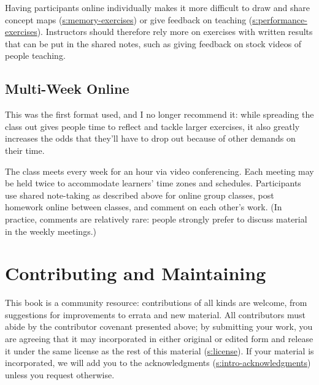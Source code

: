 Having participants online individually makes it more difficult to draw
and share concept maps (\protect\hyperlink{SECTION}{s:memory-exercises}) or give
feedback on teaching (\protect\hyperlink{SECTION}{s:performance-exercises}). Instructors
should therefore rely more on exercises with written results that can be
put in the shared notes, such as giving feedback on stock videos of
people teaching.

\subsection{Multi-Week Online}\label{multi-week-online}

This was the first format used, and I no longer recommend it: while
spreading the class out gives people time to reflect and tackle larger
exercises, it also greatly increases the odds that they'll have to drop
out because of other demands on their time.

The class meets every week for an hour via video conferencing. Each
meeting may be held twice to accommodate learners' time zones and
schedules. Participants use shared note-taking as described above for
online group classes, post homework online between classes, and comment
on each other's work. (In practice, comments are relatively rare: people
strongly prefer to discuss material in the weekly meetings.)

\section{Contributing and Maintaining}\label{s:joining-contributing}

This book is a community resource: contributions of all kinds are
welcome, from suggestions for improvements to errata and new material.
All contributors must abide by the contributor covenant presented above;
by submitting your work, you are agreeing that it may incorporated in
either original or edited form and release it under the same license as
the rest of this material (\protect\hyperlink{APPENDIX}{s:license}). If your material is
incorporated, we will add you to the acknowledgments
(\protect\hyperlink{SECTION}{s:intro-acknowledgments}) unless you request otherwise.

